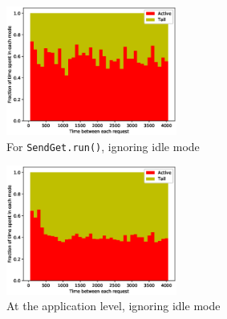 \begin{figure}
  \includegraphics[width=0.5\textwidth]{figures/google_method_2states.eps}
  \caption{For \texttt{SendGet.run()}, ignoring idle mode}
  \label{fig:ggl:2:meth}
\vspace {-0.31in}
\end{figure}

\begin{figure}
  \includegraphics[width=0.5\textwidth]{figures/google_global_2states.eps}
  \caption{At the application level, ignoring idle mode}
  \label{fig:ggl:2:glob}
\vspace {-0.32in}
\end{figure}
